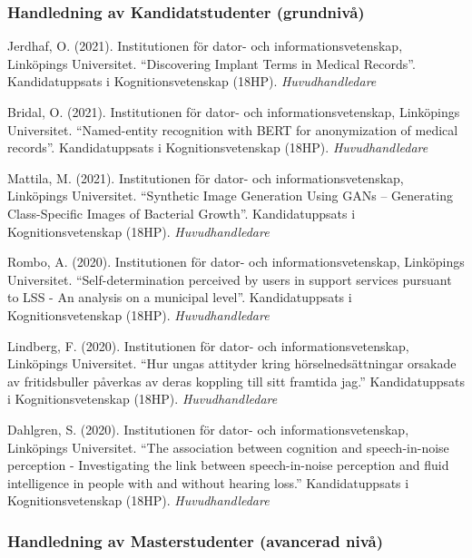 \documentclass[]{article}
\begin{document}
\hypertarget{handledning-av-kandidatstudenter-grundnivuxe5}{%
\subsubsection{Handledning av Kandidatstudenter
(grundnivå)}\label{handledning-av-kandidatstudenter-grundnivuxe5}}

Jerdhaf, O. (2021). Institutionen för dator- och informationsvetenskap,
Linköpings Universitet. ``Discovering Implant Terms in Medical
Records''. Kandidatuppsats i Kognitionsvetenskap (18HP).
\emph{Huvudhandledare}

Bridal, O. (2021). Institutionen för dator- och informationsvetenskap,
Linköpings Universitet. ``Named-entity recognition with BERT for
anonymization of medical records''. Kandidatuppsats i
Kognitionsvetenskap (18HP). \emph{Huvudhandledare}

Mattila, M. (2021). Institutionen för dator- och informationsvetenskap,
Linköpings Universitet. ``Synthetic Image Generation Using GANs --
Generating Class-Specific Images of Bacterial Growth''. Kandidatuppsats
i Kognitionsvetenskap (18HP). \emph{Huvudhandledare}

Rombo, A. (2020). Institutionen för dator- och informationsvetenskap,
Linköpings Universitet. ``Self-determination perceived by users in
support services pursuant to LSS - An analysis on a municipal level''.
Kandidatuppsats i Kognitionsvetenskap (18HP). \emph{Huvudhandledare}

Lindberg, F. (2020). Institutionen för dator- och informationsvetenskap,
Linköpings Universitet. ``Hur ungas attityder kring hörselnedsättningar
orsakade av fritidsbuller påverkas av deras koppling till sitt framtida
jag.'' Kandidatuppsats i Kognitionsvetenskap (18HP).
\emph{Huvudhandledare}

Dahlgren, S. (2020). Institutionen för dator- och informationsvetenskap,
Linköpings Universitet. ``The association between cognition and
speech-in-noise perception - Investigating the link between
speech-in-noise perception and fluid intelligence in people with and
without hearing loss.'' Kandidatuppsats i Kognitionsvetenskap (18HP).
\emph{Huvudhandledare}

\hypertarget{handledning-av-masterstudenter-avancerad-nivuxe5}{%
\subsubsection{Handledning av Masterstudenter (avancerad
nivå)}\label{handledning-av-masterstudenter-avancerad-nivuxe5}}
\end{document}
